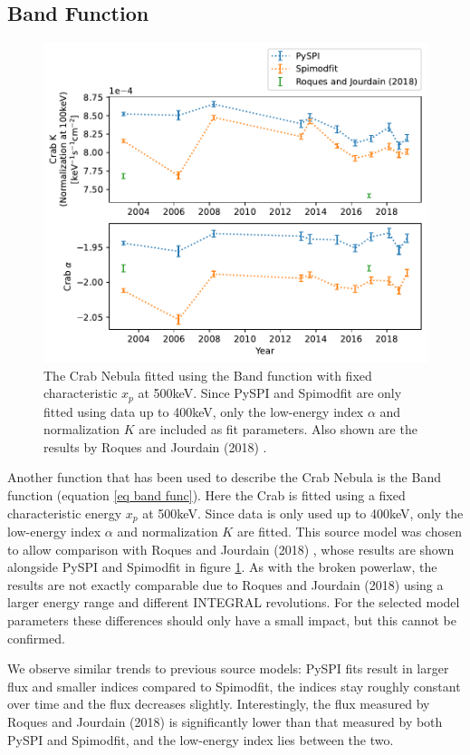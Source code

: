 \documentclass{report}
\begin{document}
\FloatBarrier

\subsection{Band Function}

\begin{figure}[h]
  \centering
  \includegraphics[width=.75\textwidth]{Images/Crab_Fits/crab_c_band.pdf}
  \caption{The Crab Nebula fitted using the Band function with fixed characteristic $x_p$ at 500keV. Since PySPI and Spimodfit are only fitted using data up to 400keV, only the low-energy index $\alpha$ and normalization $K$ are included as fit parameters. Also shown are the results by Roques and Jourdain (2018) \cite{Roques}.}
  \label{fit crab c band}
\end{figure}

Another function that has been used to describe the Crab Nebula is the Band function (equation \ref{eq band func}). Here the Crab is fitted using a fixed characteristic energy $x_p$ at 500keV. Since data is only used up to 400keV, only the low-energy index $\alpha$ and normalization $K$ are fitted. This source model was chosen to allow comparison with Roques and Jourdain (2018) \cite{Roques}, whose results are shown alongside PySPI and Spimodfit in figure \ref{fit crab c band}. As with the broken powerlaw, the results are not exactly comparable due to Roques and Jourdain (2018) \cite{Roques} using a larger energy range and different INTEGRAL revolutions. For the selected model parameters these differences should only have a small impact, but this cannot be confirmed.

We observe similar trends to previous source models: PySPI fits result in larger flux and smaller indices compared to Spimodfit, the indices stay roughly constant over time and the flux decreases slightly. Interestingly, the flux measured by Roques and Jourdain (2018) \cite{Roques} is significantly lower than that measured by both PySPI and Spimodfit, and the low-energy index lies between the two.
\end{document}
